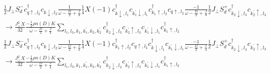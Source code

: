\documentclass[12pt]{revtex4-2}
\begin{document}
\begin{equation}\begin{aligned}
	&\frac{1}{2}J_\perp S_d^- c^\dagger_{q \uparrow, l_2}c_{k \downarrow, l_2} \frac{1}{\omega - \frac{D}{2} + \frac{J}{4}} \frac{1}{4}X \left( -1 \right) c^\dagger_{k \downarrow,l_1}c_{k_1^\prime\downarrow,l_1}c^\dagger_{k_1 \uparrow,l_2}c_{q \uparrow,l_2} \frac{-1}{\omega - \frac{D}{2} + \frac{J}{4}}\frac{1}{2}J_\perp S_d^+ c^\dagger_{k_2 \downarrow, l_3}c_{k_2^\prime \uparrow, l_3} \\
	&\longrightarrow \frac{J_\perp^2 X}{32} \frac{-\frac{1}{2}\rho n(D) K}{\omega - \frac{D}{2} + \frac{J}{4}}\sum_{l_1, l_3, k_1, k_1^\prime,k_2,k_2^\prime} c^\dagger_{k_2 \downarrow, l_3}c_{k_2^\prime \uparrow, l_3}c_{k_1^\prime\downarrow,l_1}c^\dagger_{k_1 \uparrow,l_2}
\end{aligned}\end{equation}
\begin{equation}\begin{aligned}
	&\frac{1}{2}J_\perp S_d^- c^\dagger_{q \uparrow, l_2}c_{k \downarrow, l_2} \frac{1}{\omega - \frac{D}{2} + \frac{J}{4}} \frac{1}{4}X \left( -1 \right) c^\dagger_{k_1 \uparrow,l_2}c_{q \uparrow,l_2} c^\dagger_{k \downarrow,l_1}c_{k_1^\prime\downarrow,l_1} \frac{-1}{\omega - \frac{D}{2} + \frac{J}{4}}\frac{1}{2}J_\perp S_d^+ c^\dagger_{k_2 \downarrow, l_3}c_{k_2^\prime \uparrow, l_3} \\
	&\longrightarrow \frac{J_\perp^2 X}{32} \frac{-\frac{1}{2}\rho n(D) K}{\omega - \frac{D}{2} + \frac{J}{4}}\sum_{l_1, l_3, k_1, k_1^\prime,k_2,k_2^\prime} c^\dagger_{k_2 \downarrow, l_3}c_{k_2^\prime \uparrow, l_3}c_{k_1^\prime\downarrow,l_1}c^\dagger_{k_1 \uparrow,l_2}
\end{aligned}\end{equation}
\end{document}
